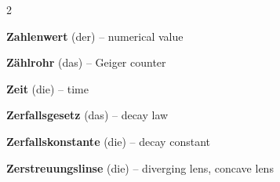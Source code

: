 \begin{multicols}{2}
\par\nopagebreak
\textbf{Zahlenwert} (der) -- numerical value\dotfill\hyperref[e:2]{\pageref*{e:2}}\par
\textbf{Zählrohr} (das) -- Geiger counter\dotfill\hyperref[e:279]{\pageref*{e:279}}\par
\textbf{Zeit} (die) -- time\dotfill\hyperref[e:36]{\pageref*{e:36}}\par
\textbf{Zerfallsgesetz} (das) -- decay law\dotfill\hyperref[e:281]{\pageref*{e:281}}\par
\textbf{Zerfallskonstante} (die) -- decay constant\dotfill\hyperref[e:282]{\pageref*{e:282}}\par
\textbf{Zerstreuungslinse} (die) -- diverging lens, concave lens\dotfill\hyperref[e:242]{\pageref*{e:242}}\par
\end{multicols}

\newpage
